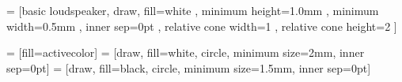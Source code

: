 
 = [basic loudspeaker, draw, fill=white
, minimum height=1.0mm    %
, minimum width=0.5mm     %
, inner sep=0pt
, relative cone width=1   %
, relative cone height=2  %
]

 = [fill=activecolor]
 = [draw, fill=white, circle, minimum size=2mm, inner sep=0pt]
 = [draw, fill=black, circle, minimum size=1.5mm, inner 
sep=0pt]


